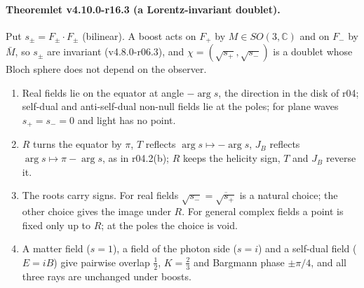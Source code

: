 \paragraph{Theoremlet v4.10.0-r16.3 (a Lorentz-invariant doublet).}
Put \(s_\pm=F_\pm\cdot F_\pm\) (bilinear).  A boost acts on \(F_+\) by \(M\in SO(3,\mathbb C)\) and on \(F_-\) by \(\bar M\), so \(s_\pm\) are
invariant (v4.8.0-r06.3), and \(\chi=(\sqrt{s_+},\sqrt{s_-})\) is a doublet whose Bloch sphere does not depend on the observer.
\begin{enumerate}[leftmargin=2em]
\item[(a)] Real fields lie on the equator at angle \(-\arg s\), the direction in the disk of r04; self-dual and anti-self-dual
non-null fields lie at the poles; for plane waves \(s_+=s_-=0\) and light has no point.
\item[(b)] \(R\) turns the equator by \(\pi\), \(T\) reflects \(\arg s\mapsto-\arg s\), \(J_B\) reflects \(\arg s\mapsto\pi-\arg s\), as in
r04.2(b); \(R\) keeps the helicity sign, \(T\) and \(J_B\) reverse it.
\item[(c)] The roots carry signs.  For real fields \(\sqrt{s_-}=\overline{\sqrt{s_+}}\) is a natural choice; the other choice gives
the image under \(R\).  For general complex fields a point is fixed only up to \(R\); at the poles the choice is void.
\item[(d)] A matter field (\(s=1\)), a field of the photon side (\(s=i\)) and a self-dual field (\(E=iB\)) give pairwise overlap
\(\tfrac12\), \(K=\tfrac23\) and Bargmann phase \(\pm\pi/4\), and all three rays are unchanged under boosts.
\end{enumerate}

